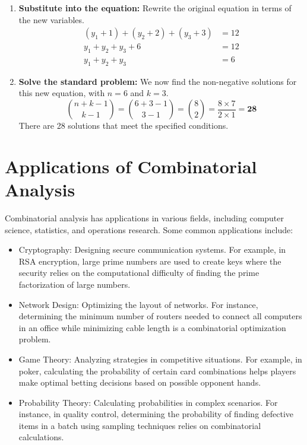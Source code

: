 \begin{solutionbox}
\begin{enumerate}
    \item \textbf{Substitute into the equation:} Rewrite the original equation in terms of the new variables.
    \begin{align*}
        (y_1+1) + (y_2+2) + (y_3+3) &= 12 \\
        y_1 + y_2 + y_3 + 6 &= 12 \\
        y_1 + y_2 + y_3 &= 6
    \end{align*}
    
    \item \textbf{Solve the standard problem:} We now find the non-negative solutions for this new equation, with $n=6$ and $k=3$.
    \[
    \binom{n+k-1}{k-1} = \binom{6+3-1}{3-1} = \binom{8}{2} = \frac{8 \times 7}{2 \times 1} = \mathbf{28}
    \]
    There are 28 solutions that meet the specified conditions.
\end{enumerate}
\end{solutionbox}









\section{Applications of Combinatorial Analysis}
Combinatorial analysis has applications in various fields, including computer science, statistics, and operations research. Some common applications include:
\begin{itemize}
    \item Cryptography: Designing secure communication systems. For example, in RSA encryption, large prime numbers are used to create keys where the security relies on the computational difficulty of finding the prime factorization of large numbers.
    
    \item Network Design: Optimizing the layout of networks. For instance, determining the minimum number of routers needed to connect all computers in an office while minimizing cable length is a combinatorial optimization problem.
    
    \item Game Theory: Analyzing strategies in competitive situations. For example, in poker, calculating the probability of certain card combinations helps players make optimal betting decisions based on possible opponent hands.
    
    \item Probability Theory: Calculating probabilities in complex scenarios. For instance, in quality control, determining the probability of finding defective items in a batch using sampling techniques relies on combinatorial calculations.
\end{itemize}
